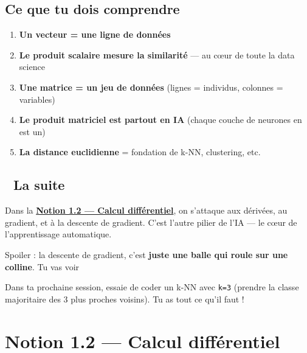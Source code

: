 \documentclass[
  french,
  11pt,
  a4paper,
]{scrbook}
\providecommand{\tightlist}{%
  \setlength{\itemsep}{0pt}\setlength{\parskip}{0pt}}
\begin{document}
\section{Ce que tu dois comprendre}\label{ce-que-tu-dois-comprendre}

\begin{enumerate}
\def\labelenumi{\arabic{enumi}.}
\tightlist
\item
  \textbf{Un vecteur = une ligne de données}
\item
  \textbf{Le produit scalaire mesure la similarité} --- au cœur de toute
  la data science
\item
  \textbf{Une matrice = un jeu de données} (lignes = individus, colonnes
  = variables)
\item
  \textbf{Le produit matriciel est partout en IA} (chaque couche de
  neurones en est un)
\item
  \textbf{La distance euclidienne} = fondation de k-NN, clustering, etc.
\end{enumerate}

\section{🚀 La suite}\label{la-suite}

Dans la \hyperref[]{\textbf{Notion 1.2 --- Calcul différentiel}}, on
s'attaque aux dérivées, au gradient, et à la descente de gradient. C'est
l'autre pilier de l'IA --- le cœur de l'apprentissage automatique.

Spoiler : la descente de gradient, c'est \textbf{juste une balle qui
roule sur une colline}. Tu vas voir 🎢

\begin{tcolorbox}[enhanced jigsaw, arc=.35mm, bottomrule=.15mm, bottomtitle=1mm, breakable, colback=white, colbacktitle=quarto-callout-tip-color!10!white, colframe=quarto-callout-tip-color-frame, coltitle=black, left=2mm, leftrule=.75mm, opacityback=0, opacitybacktitle=0.6, rightrule=.15mm, title=\textcolor{quarto-callout-tip-color}{\faLightbulb}\hspace{0.5em}{💡 Petit défi}, titlerule=0mm, toprule=.15mm, toptitle=1mm]

Dans ta prochaine session, essaie de coder un k-NN avec \texttt{k=3}
(prendre la classe majoritaire des 3 plus proches voisins). Tu as tout
ce qu'il faut !

\end{tcolorbox}

\chapter{Notion 1.2 --- Calcul
différentiel}\label{notion-1.2-calcul-diffuxe9rentiel}
\end{document}

